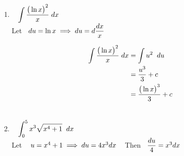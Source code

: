 \documentclass[11pt,a4paper]{article}
\begin{document}
\begin{enumerate}
Let $\hspace{0.2cm} u = 5 + \sin x\hspace{0.2cm}$ Then $\hspace{0.2cm}du = \cos x dx$

\begin{align*}
\implies \hspace{0.5cm} \int \dfrac{\cos x}{\big(5 + \sin x \big)^2}\hspace{0.1cm}dx & = \int u^{-2}\hspace{0.1cm}du\\
& = \dfrac{u^{-2+1}}{-2 + 1} + c\\\\
& = -\dfrac{1}{u} + c\\
& = \dfrac{-1}{5 + \sin x} + c\\\\
\end{align*}





\item $\hspace{0.3cm}\displaystyle{\int \dfrac{\big(\ln x\big)^2}{x}\hspace{0.1cm}dx}$\\

Let $\hspace{0.2cm} du = \ln x \implies du = d\dfrac{dx}{x}$


\begin{align*}
\int \dfrac{\big(\ln x\big)^2}{x}\hspace{0.1cm}dx & = \int u^2\hspace{0.2cm}du \\
& = \dfrac{u^3}{3} + c\\
& = \dfrac{\big(\ln x \big)^3}{3} + c\\\\
\end{align*}






\item $\hspace{0.3cm}\displaystyle{\int^5_0 x^3\sqrt{x^4 + 1}\hspace{0.2cm}dx}$\\

Let $\hspace{0.3cm} u = x^4 + 1\implies du = 4x^3dx\hspace{0.3cm}$ Then $\hspace{0.2cm} \dfrac{du}{4} = x^3dx$


\end{enumerate}
\end{document}
